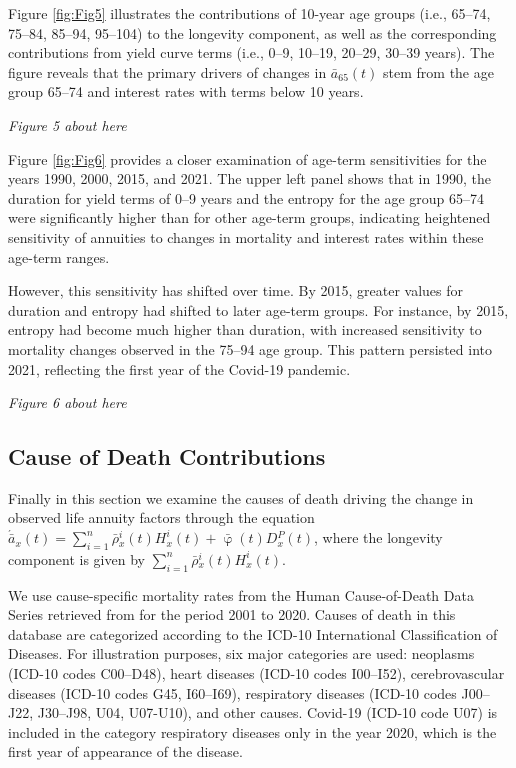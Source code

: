 \documentclass[12pt]{article}
\begin{document}
Figure \ref{fig:Fig5} illustrates the contributions of 10-year age groups (i.e., 65–74, 75–84, 85–94, 95–104) to the longevity component, as well as the corresponding contributions from yield curve terms (i.e., 0–9, 10–19, 20–29, 30–39 years). The figure reveals that the primary drivers of changes in \( \bar{a}_{65}(t) \) stem from the age group 65–74 and interest rates with terms below 10 years.

\begin{center}
	\textit{Figure 5 about here}
\end{center}

Figure \ref{fig:Fig6} provides a closer examination of age-term sensitivities for the years 1990, 2000, 2015, and 2021. The upper left panel shows that in 1990, the duration for yield terms of 0–9 years and the entropy for the age group 65–74 were significantly higher than for other age-term groups, indicating heightened sensitivity of annuities to changes in mortality and interest rates within these age-term ranges. 

However, this sensitivity has shifted over time. By 2015, greater values for duration and entropy had shifted to later age-term groups. For instance, by 2015, entropy had become much higher than duration, with increased sensitivity to mortality changes observed in the 75–94 age group. This pattern persisted into 2021, reflecting the first year of the Covid-19 pandemic.




\begin{center}
	\textit{Figure 6 about here}
\end{center}

\subsection{Cause of Death Contributions}

Finally in this section we examine the causes of death driving the change in observed life annuity factors through the equation $\acute{\bar{a}} _x(t) = \sum_{i=1}^{n} \bar{\rho}{^i_x}(t){H}^{i}_x(t)+\bar{\upvarphi}(t){D}{^P_x}(t)$, where the longevity component is given by $\sum_{i=1}^{n} \bar{\rho}{^i_x}(t){H}^{i}_x(t)$. 


We use cause-specific mortality rates from the Human Cause-of-Death Data Series retrieved from \citep{HCD2024} for the period 2001 to 2020. Causes of death in this database are categorized according to the ICD-10 International Classification of Diseases. For illustration purposes, six major categories are used: neoplasms (ICD-10 codes C00–D48), heart diseases (ICD-10 codes I00–I52), cerebrovascular diseases (ICD-10 codes G45, I60–I69), respiratory diseases (ICD-10 codes J00–J22, J30–J98, U04, U07-U10), and other causes. Covid-19 (ICD-10 code U07) is included in the category respiratory diseases only in the year 2020, which is the first year of appearance of the disease.
\end{document}
